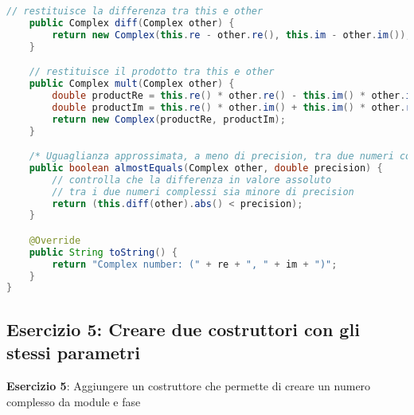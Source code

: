 \documentclass{article}
\begin{document}
\begin{lstlisting}[language=Java,escapechar=|]
    // restituisce la differenza tra this e other
    public Complex diff(Complex other) {
	    return new Complex(this.re - other.re(), this.im - other.im());
    }

    // restituisce il prodotto tra this e other
    public Complex mult(Complex other) {
	    double productRe = this.re() * other.re() - this.im() * other.im();
	    double productIm = this.re() * other.im() + this.im() * other.re();
	    return new Complex(productRe, productIm);
    }

    /* Uguaglianza approssimata, a meno di precision, tra due numeri complessi Riguardo all'operazione di uguaglianza tra complessi non e' consigliabile utilizzare l'operatore ==, poiche' in tal modo basterebbe un errore di arrotondamento per far risultare due numeri diversi. Per ovviare a cio' si utilizza un parametro  che indica la tolleranza da adottare.*/
    public boolean almostEquals(Complex other, double precision) {
    	// controlla che la differenza in valore assoluto
	    // tra i due numeri complessi sia minore di precision
	    return (this.diff(other).abs() < precision);
    }

    @Override
    public String toString() {
	    return "Complex number: (" + re + ", " + im + ")";
    }
}
\end{lstlisting}






\subsection{Esercizio 5: Creare due costruttori con gli stessi parametri}
\begin{framed}
\textbf{Esercizio 5}:  Aggiungere un costruttore che permette di creare un numero complesso da module e fase
\end{framed}
\end{document}
